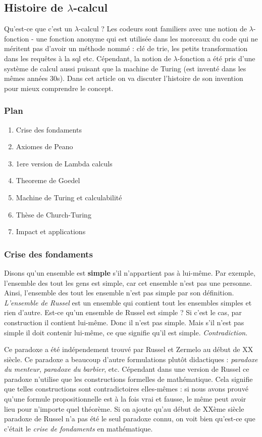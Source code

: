 \documentclass[12pt, a4paper]{article}
\begin{document}
\subsection*{Histoire de $\lambda$-calcul}

Qu'est-ce que c'est un $\lambda$-calcul ?
Les codeurs sont familiers avec une notion de $\lambda$-fonction - une fonction anonyme qui est utilisée dans les morceaux du code qui ne méritent pas d'avoir un méthode nommé : clé de trie, les petits transformation dans les requêtes à la sql etc.
Cépendant, la notion de $\lambda$-fonction a été pris d'une système de calcul aussi puisant que la machine de Turing (est inventé dans les mêmes années 30s).
Dans cet article on va discuter l'histoire de son invention pour mieux comprendre le concept.

\subsubsection*{Plan}
\begin{enumerate}
	\item Crise des fondaments
	\item Axiomes de Peano
	\item 1ere version de Lambda calculs
	\item Theoreme de Goedel
	\item Machine de Turing et calculabilité
	\item Thèse de Church-Turing
	\item Impact et applications
\end{enumerate}


\subsubsection*{Crise des fondaments}
Disons qu'un ensemble est \textbf{simple} s'il n'appartient pas à lui-même. Par exemple, l'ensemble des tout les gens est simple, car cet ensemble n'est pas une personne. Ainsi, l'ensemble des tout les ensemble n'est pas simple par son définition. \emph{L'ensemble de Russel} est un ensemble qui contient tout les ensembles simples et rien d'autre.
Est-ce qu'un ensemble de Russel est simple ? Si c'est le cas, par construction il contient lui-même. Donc il n'est pas simple. Mais s'il n'est pas simple il doit contenir lui-même, ce que signifie qu'il est simple. \emph{Contradiction}.

Ce paradoxe a été indépendement trouvé par Russel et Zermelo au début de XX siècle. Ce paradoxe a beaucoup d'autre formulations plutôt didactiques : \emph{paradoxe du menteur}, \emph{paradoxe du barbier}, etc. 
Cépendant dans une version de Russel ce paradoxe n'utilise que les constructions formelles de mathématique. Cela signifie que telles constructions sont contradictoires elles-mêmes : si nous avons prouvé qu'une formule propositionnelle est à la fois vrai et fausse, le même peut avoir lieu pour n'importe quel théorème.
Si on ajoute qu'au début de XXème siècle paradoxe de Russel n'a pas été le seul paradoxe connu, on voit bien qu'est-ce que c'était le \emph{crise de fondaments} en mathématique.
\end{document}
